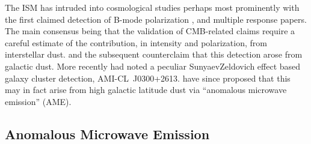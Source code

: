     The ISM has intruded into cosmological studies perhaps most prominently with the first claimed detection of B-mode polarization \citep{hanson13, bicep214, flauger14}, and multiple response papers. The main consensus being that the validation of CMB-related claims require a careful estimate of the contribution, in intensity and polarization, from interstellar dust. and the subsequent counter\-claim that this detection arose from galactic dust\citep{planckIntL17, sheehy17}. More recently \cite{shimwell12} had noted a peculiar Sunyaev\-Zeldovich effect based galaxy cluster detection, AMI-CL~J0300+2613. \cite{perrott18} have since proposed that this may in fact arise from high galactic latitude dust via ``anomalous microwave emission'' (AME).

  \subsection{Anomalous Microwave Emission}

